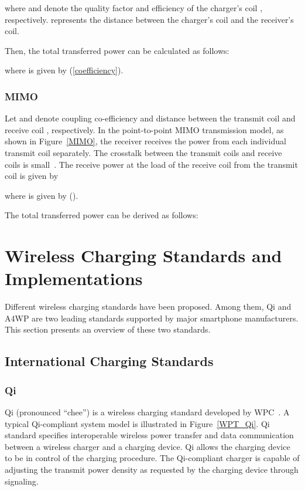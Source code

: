 \documentclass[twocolumn,10pt]{IEEEtran}
\begin{document}
where  and  denote the quality factor and efficiency of the charger's coil , respectively.  represents the distance between the charger's coil  and the receiver's coil. 


Then, the total transferred power can be calculated as follows:

where  is given by (\ref{coefficiency}). 
 
 

\subsubsection{MIMO}

Let  and  denote coupling co-efficiency and distance between the transmit coil  and receive coil , respectively.
In the point-to-point MIMO transmission model, as shown in Figure~\ref{MIMO}, the receiver receives the power from each individual transmit coil separately. The crosstalk between the transmit coils and receive coils is small~\cite{H.2013Nguyen}. The receive power at the load of the receive coil  from the transmit coil   is given by

where  is given by ().

The total transferred power can be derived as follows:






\section{Wireless Charging Standards and Implementations}

Different wireless charging standards have been proposed. Among them, Qi and A4WP are two leading standards supported by major smartphone manufacturers. This section presents an overview of these two standards. 


\subsection{International Charging Standards}

\subsubsection{Qi}

Qi (pronounced ``chee'') is a wireless charging standard developed by WPC~\cite{WPC}. A typical Qi-compliant system model is illustrated in Figure~\ref{WPT_Qi}. Qi standard specifies interoperable wireless power transfer and data communication between a wireless charger and a charging device. Qi allows the charging device to be in control of the charging procedure. The Qi-compliant charger is capable of adjusting the transmit power density as requested by the charging device through signaling. 
\end{document}
